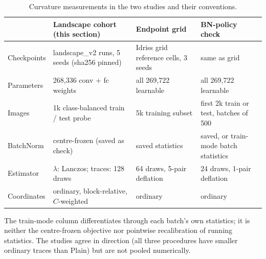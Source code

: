 \begin{table}[!t]
\caption{Curvature measurements in the two studies and their conventions.}\label{tab:geometry-studies}
\centering\small\setlength{\tabcolsep}{4pt}\renewcommand{\arraystretch}{1.08}
\begin{tabular*}{\linewidth}{@{\extracolsep{\fill}}llll@{}}
\toprule
 & Landscape cohort (this section) & Endpoint grid & BN-policy check\\
\midrule
Checkpoints & landscape\_v2 runs, 5 seeds (sha256 pinned) & Idriss grid reference cells, 3 seeds & same as grid\\
Parameters & 268,336 conv + fc weights & all 269,722 learnable & all 269,722 learnable\\
Images & 1k class-balanced train / test probe & 5k training subset & first 2k train or test, batches of 500\\
BatchNorm & centre-frozen (saved as check) & saved statistics & saved, or train-mode batch statistics\\
Estimator & $\lambda$: Lanczos; traces: 128 draws & 64 draws, 5-pair deflation & 24 draws, 1-pair deflation\\
Coordinates & ordinary, block-relative, $C$-weighted & ordinary & ordinary\\
\bottomrule
\end{tabular*}
\par\smallskip\begin{minipage}{\linewidth}\footnotesize The train-mode column differentiates through each batch's own statistics; it is neither the centre-frozen objective nor pointwise recalibration of running statistics. The studies agree in direction (all three procedures have smaller ordinary traces than Plain) but are not pooled numerically.\end{minipage}
\end{table}
